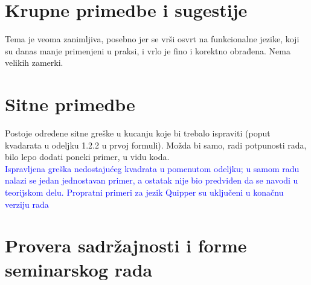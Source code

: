 \documentclass[a4paper]{report}
\newcommand{\odgovor}[1]{\textcolor{blue}{#1}}
\begin{document}
\section{Krupne primedbe i sugestije}
Tema je veoma zanimljiva, posebno jer se vrši osvrt na funkcionalne jezike, koji su danas manje 
primenjeni u praksi, i vrlo je fino i korektno obrađena. Nema velikih zamerki.

\section{Sitne primedbe}
Postoje određene sitne greške u kucanju koje bi trebalo ispraviti (poput kvadarata u odeljku 1.2.2 
u prvoj formuli). Možda bi samo, radi potpunosti rada, bilo lepo dodati poneki primer, u vidu koda.\\
\odgovor {Ispravljena greška nedostajućeg kvadrata u pomenutom odeljku; u samom radu nalazi se jedan jednostavan primer, a ostatak nije bio predviđen da se navodi u teorijskom delu. Propratni primeri za jezik Quipper su uključeni u konačnu verziju rada}
\section{Provera sadržajnosti i forme seminarskog rada}
\end{document}
